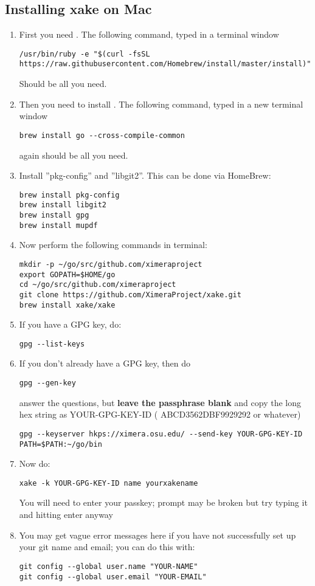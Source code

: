 \documentclass{ximera}
\begin{document}
\subsection{Installing xake on Mac}

\begin{enumerate}
\item First you need . The following command, typed in a terminal window
\begin{verbatim}
/usr/bin/ruby -e "$(curl -fsSL https://raw.githubusercontent.com/Homebrew/install/master/install)"
\end{verbatim}
Should be all you need. 
\item Then you need to install . The following command, typed in a new terminal window
\begin{verbatim}
brew install go --cross-compile-common
\end{verbatim}
again should be all you need.
\item Install ''pkg-config” and ''libgit2”. This can be done via HomeBrew:
\begin{verbatim}
brew install pkg-config
brew install libgit2
brew install gpg
brew install mupdf
\end{verbatim}
\item Now perform the following commands in terminal:
\begin{verbatim}
mkdir -p ~/go/src/github.com/ximeraproject
export GOPATH=$HOME/go
cd ~/go/src/github.com/ximeraproject
git clone https://github.com/XimeraProject/xake.git
brew install xake/xake
\end{verbatim}
\item If you have a GPG key, do:
\begin{verbatim}
gpg --list-keys
\end{verbatim}
\item If you don’t already have a GPG key, then do
\begin{verbatim}
gpg --gen-key
\end{verbatim}
answer the questions, but \textbf{leave the passphrase blank} and copy the long hex string as YOUR-GPG-KEY-ID ( ABCD3562DBF9929292 or whatever)
\begin{verbatim}
gpg --keyserver hkps://ximera.osu.edu/ --send-key YOUR-GPG-KEY-ID
PATH=$PATH:~/go/bin
\end{verbatim}
\item Now do: 
\begin{verbatim}
xake -k YOUR-GPG-KEY-ID name yourxakename
\end{verbatim}
You will need to enter your passkey; prompt may be broken but try typing it and hitting enter anyway

\item You may get vague error messages here if you have not successfully set up your git name and email; you can do this with:
\begin{verbatim}
git config --global user.name "YOUR-NAME"
git config --global user.email "YOUR-EMAIL"
\end{verbatim}
\end{enumerate}
\end{document}
